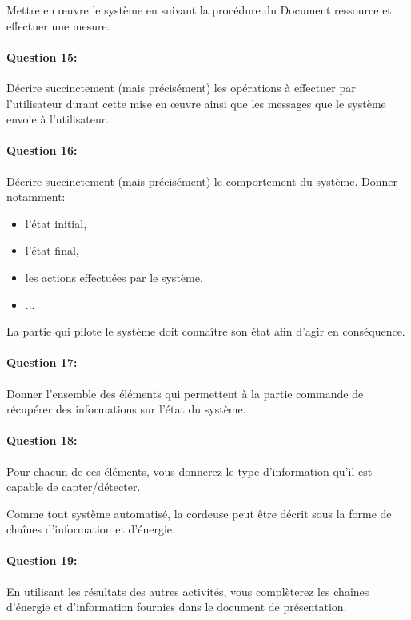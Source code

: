 
Mettre en \oe uvre le système en suivant la procédure du Document ressource et effectuer une mesure.

\paragraph{Question 15:} Décrire succinctement (mais précisément) les opérations à effectuer par l'utilisateur durant cette mise en \oe uvre ainsi que les messages que le système envoie à l'utilisateur.

\paragraph{Question 16:} Décrire succinctement (mais précisément) le comportement du système. Donner notamment:
\begin{itemize}
 \item l'état initial,
 \item l'état final,
 \item les actions effectuées par le système,
 \item ...
\end{itemize}


La partie qui pilote le système doit connaître son état afin d'agir en conséquence. 

\paragraph{Question 17:} Donner l'ensemble des éléments qui permettent à la partie commande de récupérer des informations sur l'état du système.

\paragraph{Question 18:} Pour chacun de ces éléments, vous donnerez le type d'information qu'il est capable de capter/détecter.


Comme tout système automatisé, la cordeuse peut être décrit sous la forme de chaînes d'information et d'énergie.

\paragraph{Question 19:} En utilisant les résultats des autres activités, vous complèterez les chaînes d'énergie et d'information fournies dans le document de présentation.

